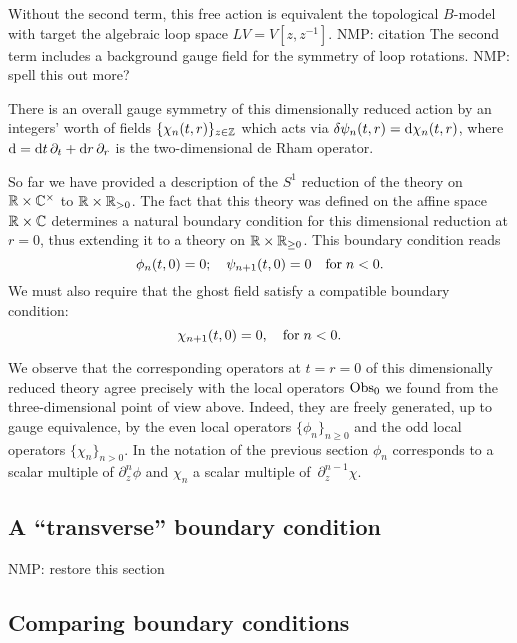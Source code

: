 \documentclass[11pt]{amsart}
\def\natalie#1{{\textcolor{green!65!black}{NMP: {#1}}}}
\begin{document}
Without the second term, this free action is equivalent the topological $B$-model with target the algebraic loop space $L V = V[z,z^{-1}]$.  \natalie{citation}
The second term includes a background gauge field for the symmetry of loop rotations. \natalie{spell this out more?}

There is an overall gauge symmetry of this dimensionally reduced action by an integers' worth of fields $\{\chi_n (t,r)\}_{z \in \mathbb Z}$ which acts via $\delta \psi_n (t,r) = {\rm d} \chi_n (t,r)$, where ${\rm d} = {\rm d} t \,\partial_t + {\rm d} r \,\partial_r$ is the two-dimensional de Rham operator. 

So far we have provided a description of the $S^1$ reduction of the theory on $\mathbb R \times \mathbb C^\times$ to $\mathbb R \times \mathbb R_{>0}$. 
The fact that this theory was defined on the affine space $\mathbb R \times \mathbb C$ determines a natural boundary condition for this dimensional reduction at $r = 0$, thus extending it to a theory on $\mathbb R \times \mathbb R_{\geq 0}$. 
This boundary condition reads
\begin{equation}\label{eqn:bc1}
\phi_n (t, 0) = 0 ; \quad \psi_{n+1} (t,0) = 0 \quad {\rm for} \; n < 0 .
\end{equation}
We must also require that the ghost field satisfy a compatible boundary condition:
\begin{equation}\label{eqn:gbc1}
\chi_{n+1} (t,0) = 0, \quad {\rm for} \; n < 0 .
\end{equation}

We observe that the corresponding operators at $t = r = 0$ of this dimensionally reduced theory agree precisely with the local operators ${\rm Obs}_0$ we found from the three-dimensional point of view above. 
Indeed, they are freely generated, up to gauge equivalence, by the even local operators $\{\phi_n\}_{n \geq 0}$ and the odd local operators $\{\chi_n\}_{n > 0}$. 
In the notation of the previous section $\phi_n$ corresponds to a scalar multiple of $\partial_z^n \phi$ and $\chi_n$ a scalar multiple of~$\partial^{n-1}_z \chi$. 

\subsection{A ``transverse'' boundary condition}
\natalie{restore this section}

\subsection*{Comparing boundary conditions}
\end{document}
